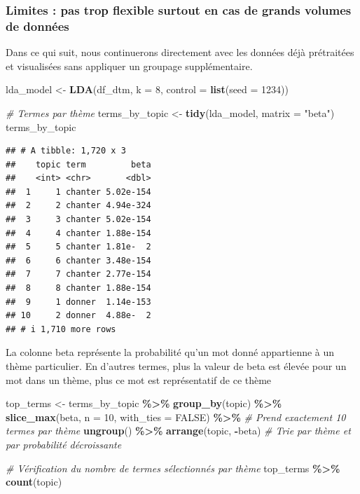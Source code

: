 \documentclass[
]{article}
\newenvironment{Shaded}{\begin{snugshade}}{\end{snugshade}}
\newcommand{\AttributeTok}[1]{\textcolor[rgb]{0.13,0.29,0.53}{#1}}
\newcommand{\CommentTok}[1]{\textcolor[rgb]{0.56,0.35,0.01}{\textit{#1}}}
\newcommand{\ConstantTok}[1]{\textcolor[rgb]{0.56,0.35,0.01}{#1}}
\newcommand{\DecValTok}[1]{\textcolor[rgb]{0.00,0.00,0.81}{#1}}
\newcommand{\FunctionTok}[1]{\textcolor[rgb]{0.13,0.29,0.53}{\textbf{#1}}}
\newcommand{\NormalTok}[1]{#1}
\newcommand{\OtherTok}[1]{\textcolor[rgb]{0.56,0.35,0.01}{#1}}
\newcommand{\SpecialCharTok}[1]{\textcolor[rgb]{0.81,0.36,0.00}{\textbf{#1}}}
\newcommand{\StringTok}[1]{\textcolor[rgb]{0.31,0.60,0.02}{#1}}
\begin{document}
\subsubsection{Limites : pas trop flexible surtout en cas de grands
volumes de
données}\label{limites-pas-trop-flexible-surtout-en-cas-de-grands-volumes-de-donnuxe9es}

Dans ce qui suit, nous continuerons directement avec les données déjà
prétraitées et visualisées sans appliquer un groupage supplémentaire.

\begin{Shaded}
\begin{Highlighting}[]
\NormalTok{lda\_model }\OtherTok{\textless{}{-}} \FunctionTok{LDA}\NormalTok{(df\_dtm, }\AttributeTok{k =} \DecValTok{8}\NormalTok{, }\AttributeTok{control =} \FunctionTok{list}\NormalTok{(}\AttributeTok{seed =} \DecValTok{1234}\NormalTok{))}

\CommentTok{\# Termes par thème}
\NormalTok{terms\_by\_topic }\OtherTok{\textless{}{-}} \FunctionTok{tidy}\NormalTok{(lda\_model, }\AttributeTok{matrix =} \StringTok{"beta"}\NormalTok{)}
\NormalTok{terms\_by\_topic}
\end{Highlighting}
\end{Shaded}

\begin{verbatim}
## # A tibble: 1,720 x 3
##    topic term         beta
##    <int> <chr>       <dbl>
##  1     1 chanter 5.02e-154
##  2     2 chanter 4.94e-324
##  3     3 chanter 5.02e-154
##  4     4 chanter 1.88e-154
##  5     5 chanter 1.81e-  2
##  6     6 chanter 3.48e-154
##  7     7 chanter 2.77e-154
##  8     8 chanter 1.88e-154
##  9     1 donner  1.14e-153
## 10     2 donner  4.88e-  2
## # i 1,710 more rows
\end{verbatim}

La colonne beta représente la probabilité qu'un mot donné appartienne à
un thème particulier. En d'autres termes, plus la valeur de beta est
élevée pour un mot dans un thème, plus ce mot est représentatif de ce
thème

\begin{Shaded}
\begin{Highlighting}[]
\NormalTok{top\_terms }\OtherTok{\textless{}{-}}\NormalTok{ terms\_by\_topic }\SpecialCharTok{\%\textgreater{}\%}
  \FunctionTok{group\_by}\NormalTok{(topic) }\SpecialCharTok{\%\textgreater{}\%}
  \FunctionTok{slice\_max}\NormalTok{(beta, }\AttributeTok{n =} \DecValTok{10}\NormalTok{, }\AttributeTok{with\_ties =} \ConstantTok{FALSE}\NormalTok{) }\SpecialCharTok{\%\textgreater{}\%}  \CommentTok{\# Prend exactement 10 termes par thème}
  \FunctionTok{ungroup}\NormalTok{() }\SpecialCharTok{\%\textgreater{}\%}
  \FunctionTok{arrange}\NormalTok{(topic, }\SpecialCharTok{{-}}\NormalTok{beta)  }\CommentTok{\# Trie par thème et par probabilité décroissante}

\CommentTok{\# Vérification du nombre de termes sélectionnés par thème}
\NormalTok{top\_terms }\SpecialCharTok{\%\textgreater{}\%}
  \FunctionTok{count}\NormalTok{(topic) }
\end{Highlighting}
\end{Shaded}
\end{document}
